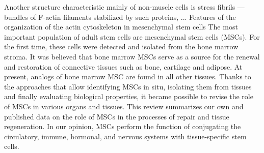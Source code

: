 \documentclass[english,authoryear]{elsarticle}
\begin{document}
Another structure characteristic mainly of non-muscle cells is stress fibrils — bundles of F-actin filaments stabilized by such proteins, ...
Features of the organization of the actin cytoskeleton in mesenchymal stem cells
The most important population of adult stem cells are mesenchymal stem cells (MSCs). For the first time, these cells were detected and isolated from the bone marrow stroma. It was believed that bone marrow MSCs serve as a source for the renewal and restoration of connective tissues such as bone, cartilage and adipose. At present, analogs of bone marrow MSC are found in all other tissues. Thanks to the approaches that allow identifying MSCs in situ, isolating them from tissues and finally evaluating biological properties, it became possible to revise the role of MSCs in various organs and tissues. This review summarizes our own and published data on the role of MSCs in the processes of repair and tissue regeneration. In our opinion, MSCs perform the function of conjugating the circulatory, immune, hormonal, and nervous systems with tissue-specific stem cells.
\end{document}
